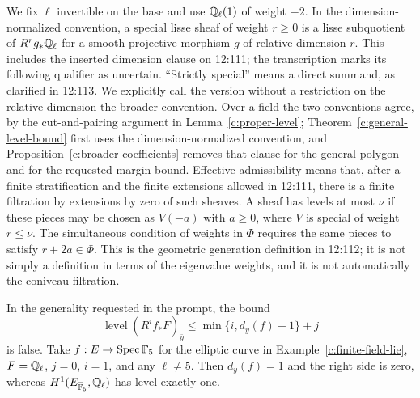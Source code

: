 \begin{definition}
\label{c:level-def}
We fix $\ell$ invertible on the base and use $\mathbb Q_\ell(1)$ of weight $-2$. In the dimension-normalized convention, a special lisse sheaf of weight $r\geq0$ is a lisse subquotient of $R^rg_*\mathbb Q_\ell$ for a smooth projective morphism $g$ of relative dimension $r$. This includes the inserted dimension clause on 12:111; the transcription marks its following qualifier as uncertain. ``Strictly special'' means a direct summand, as clarified in 12:113. We explicitly call the version without a restriction on the relative dimension the broader convention. Over a field the two conventions agree, by the cut-and-pairing argument in Lemma~\ref{c:proper-level}; Theorem~\ref{c:general-level-bound} first uses the dimension-normalized convention, and Proposition~\ref{c:broader-coefficients} removes that clause for the general polygon and for the requested margin bound. Effective admissibility means that, after a finite stratification and the finite extensions allowed in 12:111, there is a finite filtration by extensions by zero of such sheaves. A sheaf has levels at most $\nu$ if these pieces may be chosen as $V(-a)$ with $a\geq0$, where $V$ is special of weight $r\leq\nu$. The simultaneous condition of weights in $\Phi$ requires the same pieces to satisfy $r+2a\in\Phi$. This is the geometric generation definition in 12:112; it is not simply a definition in terms of the eigenvalue weights, and it is not automatically the coniveau filtration.
\end{definition}

\begin{proposition}
\label{c:level-counterexample}
In the generality requested in the prompt, the bound
\[
 \operatorname{level}(R^if_*F)_{\bar y}
 \leq\min\{i,d_y(f)-1\}+j
\]
is false. Take $f:E\to\operatorname{Spec}\mathbb F_5$ for the elliptic curve in Example~\ref{c:finite-field-lie}, $F=\mathbb Q_\ell$, $j=0$, $i=1$, and any $\ell\ne5$. Then $d_y(f)=1$ and the right side is zero, whereas $H^1(E_{\overline{\mathbb F}_5},\mathbb Q_\ell)$ has level exactly one.
\end{proposition}

